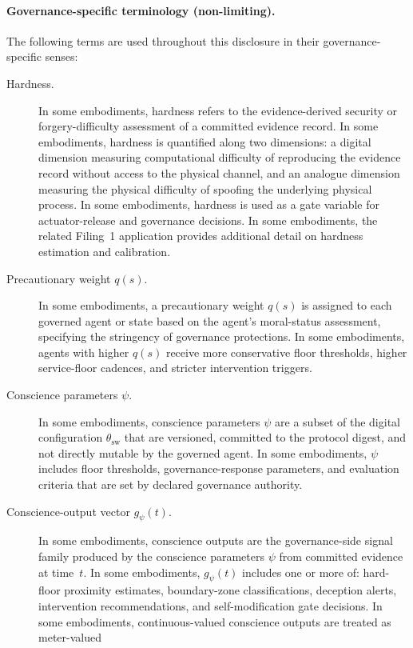 \documentclass[a4paper,12pt]{article}
\begin{document}
\paragraph{Governance-specific terminology (non-limiting).}
The following terms are used throughout this disclosure in their
governance-specific senses:
\begin{description}
  \item[Hardness.] In some embodiments, hardness refers to the
    evidence-derived security or forgery-difficulty assessment of a
    committed evidence record. In some embodiments, hardness is
    quantified along two dimensions: a digital dimension measuring
    computational difficulty of reproducing the evidence record
    without access to the physical channel, and an analogue dimension
    measuring the physical difficulty of spoofing the underlying
    physical process. In some embodiments, hardness is
    used as a gate variable for actuator-release and governance
    decisions. In some embodiments, the related Filing~1 application
    provides additional detail on hardness estimation
    and calibration.
  \item[Precautionary weight $q(s)$.] In some embodiments, a
    precautionary weight $q(s)$ is assigned to each governed agent or
    state based on the agent's moral-status assessment, specifying
    the stringency of governance protections. In some embodiments,
    agents with higher $q(s)$ receive more conservative floor
    thresholds, higher service-floor cadences, and stricter
    intervention triggers.
  \item[Conscience parameters $\psi$.] In some embodiments,
    conscience parameters $\psi$ are a subset of the digital
    configuration $\theta_{\mathrm{sw}}$ that are versioned,
    committed to the protocol digest, and not directly mutable by
    the governed agent. In some embodiments, $\psi$ includes floor
    thresholds, governance-response parameters, and evaluation
    criteria that are set by declared governance authority.
  \item[Conscience-output vector $g_{\psi}(t)$.] In some embodiments,
    conscience outputs are the governance-side signal family produced
    by the conscience parameters $\psi$ from committed evidence at
    time~$t$. In some embodiments, $g_{\psi}(t)$ includes one or more
    of: hard-floor proximity estimates, boundary-zone
    classifications, deception alerts, intervention recommendations,
    and self-modification gate decisions. In some embodiments,
    continuous-valued conscience outputs are treated as meter-valued

\end{description}
\end{document}
